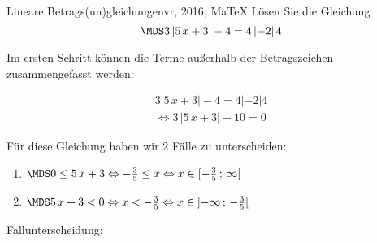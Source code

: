  \providecommand{\MoIl}[1][]{\mbox{}#1]\mathopen{}} 
 \providecommand{\MoIr}[1][]{#1[\mbox{}} 
 \providecommand{\MIntvlSep}{;} 
 \providecommand{\MElSetSep}{\, ; \, } 
 \begin{MAufgabe}{Lineare Betrags(un)gleichungen}{vr, 2016, MaTeX}
L\"osen Sie die Gleichung
$$
 \MDS 3\left| 5\, x + 3 \right|-4= 4 \left| -2 \right| 4
$$  

\ifLsg\MLoesung

Im ersten Schritt k\"onnen die Terme au\ss{}erhalb der Betragszeichen zusammengefasst werden:

\begin{align*} 
 3\left| 5\, x + 3 \right|-4= 4 \left| -2 \right| 4\\ 
\Leftrightarrow3\, \left|5\, x + 3\right| - 10= 0 
 \end{align*}

F\"ur diese Gleichung haben wir 2 F\"alle zu unterscheiden: 
\begin{enumerate}
\item $ \MDS 
0 \leq 5\, x + 3
\Leftrightarrow - \frac{3}{5} \leq x\Leftrightarrow x \in [ - \frac{3}{5} \, \MIntvlSep \, \infty\MoIr $ 
\item $ \MDS 
5\, x + 3 < 0
\Leftrightarrow x < - \frac{3}{5}\Leftrightarrow x \in \MoIl  -\infty \, \MIntvlSep \, - \frac{3}{5}\MoIr $ 
\end{enumerate} 
Fallunterscheidung: 


\end{MAufgabe}
